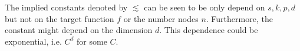 \begin{remark}
    The implied constants denoted by $\lesssim$ can be seen to be only depend on
    $s, k, p, d$ but not on the target function $f$ or the number nodes $n$.
    Furthermore, the constant might depend on the dimension $d$. This dependence
    could be exponential, i.e. $C^d$ for some $C$.
\end{remark}

